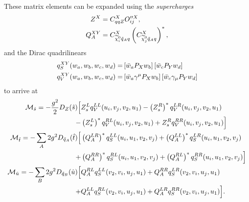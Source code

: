 \documentclass[../main.tex]{subfiles}
\begin{document}
These matrix elements can be expanded using the \textit{supercharges}
\begin{subequations}
	\begin{align}
		Z^X      & = C_{qqZ}^X O_{ij}^{\prime\prime X},                                            \\
		Q_A^{XY} & = C_{\nino[i] \tilde{q}_A q}^{X} \pclosed{C_{\nino[j] \tilde{q}_A q}^{X}}^\ast,
	\end{align}
\end{subequations}
and the Dirac quadrilinears
\begin{subequations}
	\begin{align}
		q_S^{XY}(w_a, w_b, w_c, w_d) = & \left[\bar{w}_a P_X w_b\right] \left[\bar{w}_c P_Y w_d\right]                       \\
		q_V^{XY}(w_a, w_b, w_c, w_d) = & \left[\bar{w}_a \gamma^\mu P_X w_b\right] \left[\bar{w}_c \gamma_\mu P_Y w_d\right]
	\end{align}
\end{subequations}
to arrive at
\begin{subequations}
	\begin{align}
		\nonumber
		\mathcal{M}_{\hat{s}} = -\frac{g^2}{2} D_Z(\hat{s}) \Big[           & Z_s^L q_V^{LL}(u_i, v_j, v_2, u_1) - \left(Z_s^R\right)^\ast q_V^{LR}(u_i, v_j, v_2, u_1)                            \\
		-                                                          & \left(Z_s^L\right)^\ast q_V^{RL}(u_i, v_j, v_2, u_1) + Z_s^R q_V^{RR}(u_i, v_j, v_2, u_1) \Big]                      \\
		\nonumber
		\mathcal{M}_{\hat{t}} = -\sum_A 2g^2 D_{\tilde{q}_A}(\hat{t}) \Big[ & \left(Q_A^{LR}\right)^\ast q_S^{LL}(u_i, u_1, v_2, v_j) +  \left(Q_A^{LL}\right)^\ast q_S^{LR}(u_i, u_1, v_2, v_j)      \\
		+                                                          & \left(Q_A^{RR}\right)^\ast q_S^{RL}(u_i, u_1, v_2, v_j) + \left(Q_A^{RL}\right)^\ast q_S^{RR}(u_i, u_1, v_2, v_j) \Big] \\
		\nonumber
		\mathcal{M}_{\hat{u}} = -\sum_B 2g^2 D_{\tilde{q}_B}(\hat{u}) \Big[ & Q_A^{RL} q_S^{LL}(v_2, v_i, u_j, u_1) + Q_A^{RR} q_S^{LR}(v_2, v_i, u_j, u_1)                                     \\
		+                                                          & Q_A^{LL} q_S^{RL}(v_2, v_i, u_j, u_1) + Q_A^{LR} q_S^{RR}(v_2, v_i, u_j, u_1) \Big].
	\end{align}
\end{subequations}
\end{document}
